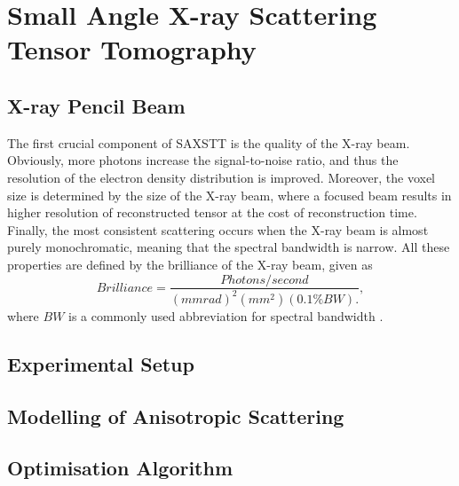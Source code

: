 \chapter{Small Angle X-ray Scattering Tensor Tomography}

\section{X-ray Pencil Beam} %
The first crucial component of SAXSTT is the quality of the X-ray beam.
Obviously, more photons increase the signal-to-noise ratio, and thus the resolution of the electron density distribution is improved.
Moreover, the voxel size is determined by the size of the X-ray beam, where a focused beam results in higher resolution of reconstructed tensor at the cost of reconstruction time.
Finally, the most consistent scattering occurs when the X-ray beam is almost purely monochromatic, meaning that the spectral bandwidth is narrow.
All these properties are defined by the brilliance of the X-ray beam, given as
\begin{equation}
    Brilliance = \frac{Photons/second}{\left( mmrad \right)^{2} \left( mm^{2} \right) \left( 0.1\% BW \right).},
\end{equation}
where $BW$ is a commonly used abbreviation for spectral bandwidth \cite{mcmorrow2011elements}.

\section{Experimental Setup}

\section{Modelling of Anisotropic Scattering}

\section{Optimisation Algorithm}
